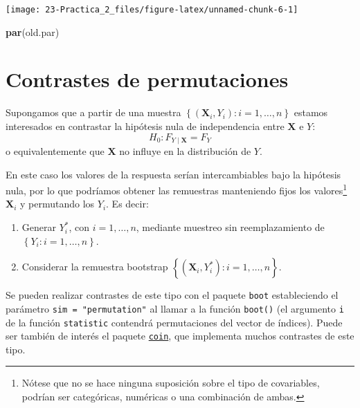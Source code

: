 \documentclass[
]{book}
\newenvironment{Shaded}{\begin{snugshade}}{\end{snugshade}}
\newcommand{\KeywordTok}[1]{\textcolor[rgb]{0.13,0.29,0.53}{\textbf{#1}}}
\newcommand{\NormalTok}[1]{#1}
\theoremstyle{definition}
\theoremstyle{definition}
\theoremstyle{definition}
\theoremstyle{remark}
\begin{document}
\begin{center}\texttt{[image: 23-Practica\_2\_files/figure-latex/unnamed-chunk-6-1]} \end{center}

\begin{Shaded}
\begin{Highlighting}[]
\KeywordTok{par}\NormalTok{(old.par)}
\end{Highlighting}
\end{Shaded}

\hypertarget{contrastes-de-permutaciones}{%
\section{Contrastes de permutaciones}\label{contrastes-de-permutaciones}}

Supongamos que a partir de una muestra
\(\left\{ \left( \mathbf{X}_i, Y_i\right): i=1,\ldots, n \right\}\)
estamos interesados en contrastar la hipótesis nula de independencia
entre \(\mathbf{X}\) e \(Y\):
\[H_0: F_{Y \mid \mathbf{X}} = F_Y\]
o equivalentemente que \(\mathbf{X}\) no influye en la distribución de \(Y\).

En este caso los valores de la respuesta serían intercambiables bajo la hipótesis nula,
por lo que podríamos obtener las remuestras manteniendo fijos los valores\footnote{Nótese que
  no se hace ninguna suposición sobre el tipo de covariables,
  podrían ser categóricas, numéricas o una combinación de ambas.}
\(\mathbf{X}_i\) y permutando los \(Y_i\). Es decir:

\begin{enumerate}
\def\labelenumi{\arabic{enumi}.}
\item
  Generar \(Y^{\ast}_i\), con \(i=1,\ldots, n\), mediante muestreo
  sin reemplazamiento de \(\left\{ Y_i: i=1,\ldots, n \right\}\).
\item
  Considerar la remuestra bootstrap
  \(\left\{ \left( \mathbf{X}_i, Y^{\ast}_i\right): i=1,\ldots, n \right\}\).
\end{enumerate}

Se pueden realizar contrastes de este tipo con el paquete \texttt{boot} estableciendo
el parámetro \texttt{sim\ =\ "permutation"} al llamar a la función \texttt{boot()} (el argumento
\texttt{i} de la función \texttt{statistic} contendrá permutaciones del vector de índices).
Puede ser también de interés el paquete \href{https://cran.r-project.org/web/packages/coin/index.html}{\texttt{coin}},
que implementa muchos contrastes de este tipo.
\end{document}
